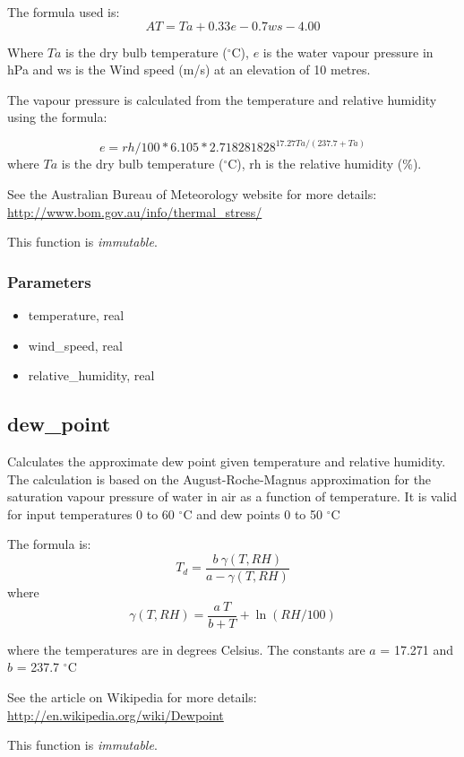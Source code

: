 \documentclass[a4paper,10pt]{book}
\begin{document}
The formula used is:
$$AT = Ta + 0.33e - 0.7ws - 4.00$$

Where $Ta$ is the dry bulb temperature ($^{\circ}$C), $e$ is the water vapour pressure in hPa and ws is the Wind speed (m/s) at an elevation of 10 metres.

The vapour pressure is calculated from the temperature and relative humidity using the formula:

$$  e = rh / 100 * 6.105 * 2.718281828 ^ { 17.27Ta / (237.7 + Ta ) }$$
where $Ta$ is the dry bulb temperature ($^{\circ}$C), rh is the relative humidity (\%).

See the Australian Bureau of Meteorology website for more details: \\ \url{http://www.bom.gov.au/info/thermal_stress/}

This function is \emph{immutable}.

\subsubsection{Parameters}
\begin{itemize}
\item temperature, real
\item wind\_speed, real
\item relative\_humidity, real
\end{itemize}

\subsection{dew\_point}
\label{dew_point}

Calculates the approximate dew point given temperature and relative humidity. The calculation is based on the August-Roche-Magnus approximation for the saturation vapour pressure of water in air as a function of temperature. It is valid for input temperatures 0 to 60 $^{\circ}$C and dew points 0 to 50 $^{\circ}$C

The formula is:
$$T_d = \frac {b\ \gamma(T,RH)} {a - \gamma(T,RH)}$$
where
$$\gamma(T,RH) = \frac {a\ T} {b+T} + \ln (RH/100)$$

where the temperatures are in degrees Celsius. The constants are $a$ = 17.271 and $b$ = 237.7 $^{\circ}$C

See the article on Wikipedia for more details: \url{http://en.wikipedia.org/wiki/Dewpoint}

This function is \emph{immutable}.
\end{document}
